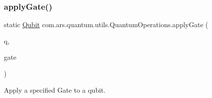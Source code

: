 \subsubsection{\texorpdfstring{apply\+Gate()}{applyGate()}\hspace{0.1cm}{\footnotesize\ttfamily [1/3]}}
{\footnotesize\ttfamily static \hyperlink{classcom_1_1ars_1_1qubits_1_1_qubit}{Qubit} com.\+ars.\+quantum.\+utils.\+Quantum\+Operations.\+apply\+Gate (\begin{DoxyParamCaption}\item[{\hyperlink{classcom_1_1ars_1_1qubits_1_1_qubit}{Qubit}}]{q,  }\item[{\hyperlink{interfacecom_1_1ars_1_1gates_1_1_i_gate}{I\+Gate}}]{gate }\end{DoxyParamCaption})\hspace{0.3cm}{\ttfamily [static]}}

Apply a specified Gate to a qubit.


